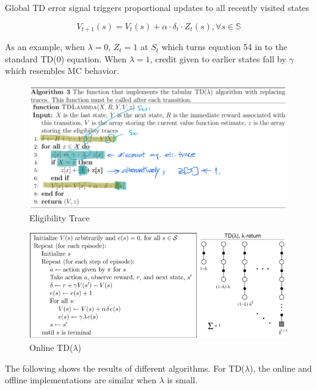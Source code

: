 \documentclass{article}
\begin{document}
\noindent
Global TD error signal triggers proportional updates to all recently visited
states

\begin{equation}
V_{t+1}(s)=V_{t}(s)+\alpha \cdot \delta_{t} \cdot Z_{t}(s), \forall s \in \mathbb{S}
\end{equation}

\noindent
As an example, when $\lambda = 0$, $Z_{t} = 1$ at $S_{t}$ which turns equation
54 in to the standard TD(0) equation. When $\lambda = 1$, credit given to
earlier states fall by $\gamma$ which resembles MC behavior.

\begin{figure}[h]
\includegraphics[scale=0.4]{elgibility_trace}
\centering
\caption{Eligibility Trace}
\end{figure}

\begin{figure}[h]
\includegraphics[scale=0.5]{eligibility_trace_online}
\centering
\caption{Online TD($\lambda$)}
\end{figure}

\newpage
\noindent
The following shows the results of different algorithms. For TD($\lambda$), the
online and offline implementations are similar when $\lambda$ is small.
\end{document}
